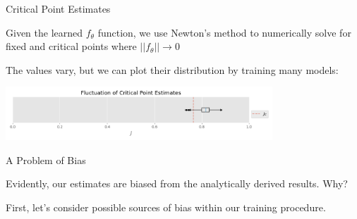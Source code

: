 \documentclass[aspectratio=169, 12pt]{beamer}
\begin{document}
\begin{frame}{Critical Point Estimates}

    
    Given the learned $f_\theta$ function, we use Newton's method to numerically solve for fixed and critical points where $||f_\theta|| \rightarrow 0$
    
    \vspace{1em}

    The values vary, but we can plot their distribution by training many models:

    \vspace{1em}

    \begin{center}
        \includegraphics[width=0.75\textwidth]{
            images/a1_critical_points_boxplot.png
        }
    \end{center}
    
\end{frame}

\begin{frame}{A Problem of Bias}

    Evidently, our estimates are biased from the analytically derived results. 
    Why? 

    \vspace{1em}

    First, let's consider possible sources of bias within our training procedure. 
    
\end{frame}
\end{document}
